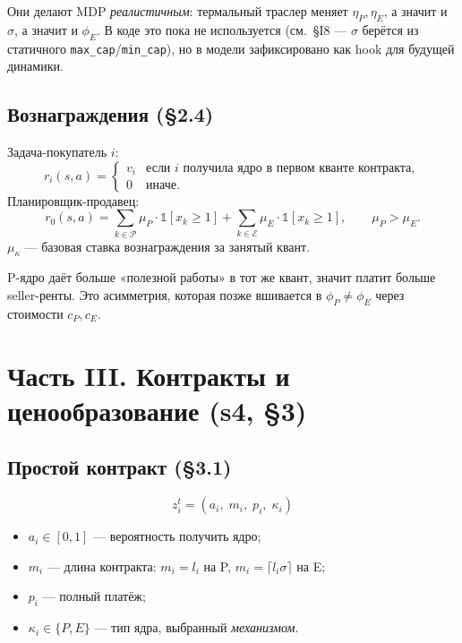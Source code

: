 \documentclass[11pt,a4paper]{article}
\begin{document}
\begin{why}
Они делают MDP \emph{реалистичным}: термальный трас\-лер меняет
$\eta_P,\eta_E$, а значит и $\sigma$, а значит и $\phi_E$. В коде
это пока не используется (см.\ §I8 — $\sigma$ берётся из статичного
\texttt{max\_cap}/\texttt{min\_cap}), но в модели зафиксировано как
hook для будущей динамики.
\end{why}

\subsection{Вознаграждения (§2.4)}

Задача-покупатель $i$:
\[
r_i(s,a) = \begin{cases}
v_i & \text{если } i \text{ получила ядро в первом кванте контракта},\\
0 & \text{иначе.}
\end{cases}
\]
Планировщик-продавец:
\[
r_0(s,a) = \sum_{k\in\mathcal{P}}\mu_P\cdot\mathbb{1}[x_k\geq 1]
+ \sum_{k\in\mathcal{E}}\mu_E\cdot\mathbb{1}[x_k\geq 1],\qquad
\mu_P > \mu_E.
\]
$\mu_\kappa$ — базовая ставка вознаграждения за занятый квант.

\begin{why}[Почему $\mu_P>\mu_E$]
P-ядро даёт больше «полезной работы» в тот же квант, значит платит
больше seller-ренты. Это асимметрия, которая позже вшивается в
$\phi_P \neq \phi_E$ через стоимости $c_P,c_E$.
\end{why}

\section{Часть III. Контракты и ценообразование (s4, §3)}

\subsection{Простой контракт (§3.1)}

\[
z_i^t = (a_i,\; m_i,\; p_i,\; \kappa_i)
\]
\begin{itemize}
  \item $a_i\in[0,1]$ — вероятность получить ядро;
  \item $m_i$ — длина контракта: $m_i=l_i$ на P, $m_i=\lceil l_i\sigma\rceil$ на E;
  \item $p_i$ — полный платёж;
  \item $\kappa_i\in\{P,E\}$ — тип ядра, выбранный \emph{механизмом}.
\end{itemize}
\end{document}
